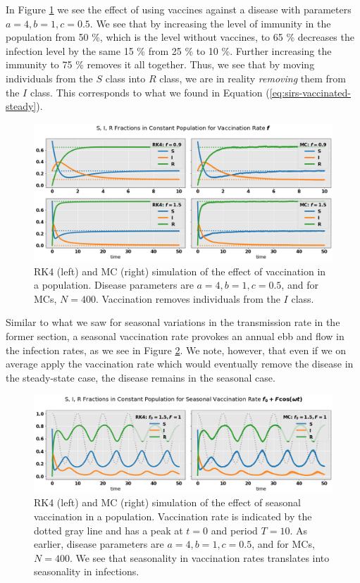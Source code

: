 \documentclass[]{article}
\begin{document}
In Figure \ref{fig:vaccination-rates} we see the effect of using vaccines against a disease with parameters $a=4, b=1, c=0.5$. We see that by increasing the level of immunity in the population from 50 \%, which is the level without vaccines, to 65 \% decreases the infection level by the same 15 \% from 25 \% to 10 \%.  Further increasing the immunity to 75 \% removes it all together. Thus, we see that by moving individuals from the $S$ class into $R$ class, we are in reality \textit{removing} them from the $I$ class. This corresponds to what we found in Equation (\ref{eq:sirs-vaccinated-steady}).

\begin{figure}[!h]
	\centering
	\includegraphics[width=1\linewidth]{./figs/vaccination-rates.png}
	\caption{RK4 (left) and MC (right) simulation of the effect of vaccination in a population. Disease parameters are $a=4, b= 1, c=0.5$, and for MCs, $N=400$. Vaccination removes individuals from the $I$ class.}
	\label{fig:vaccination-rates}
\end{figure}

Similar to what we saw for seasonal variations in the transmission rate in the former section, a seasonal vaccination rate provokes an annual ebb and flow in the infection rates, as we see in Figure \ref{fig:seasonal-vaccination-rate}. We note, however, that even if we on average apply the vaccination rate which would eventually remove the disease in the steady-state case, the disease remains in the seasonal case. 

\begin{figure}[!h]
	\centering
	\includegraphics[width=1\linewidth]{./figs/seasonal-vaccination-rate.png}
	\caption{RK4 (left) and MC (right) simulation of the effect of seasonal vaccination in a population. Vaccination rate is indicated by the dotted gray line and has a peak at $t=0$ and period $T=10$. As earlier, disease parameters are $a=4, b= 1, c=0.5$, and for MCs, $N=400$. We see that seasonality in vaccination rates translates into seasonality in infections.}
	\label{fig:seasonal-vaccination-rate}
\end{figure}
\end{document}
